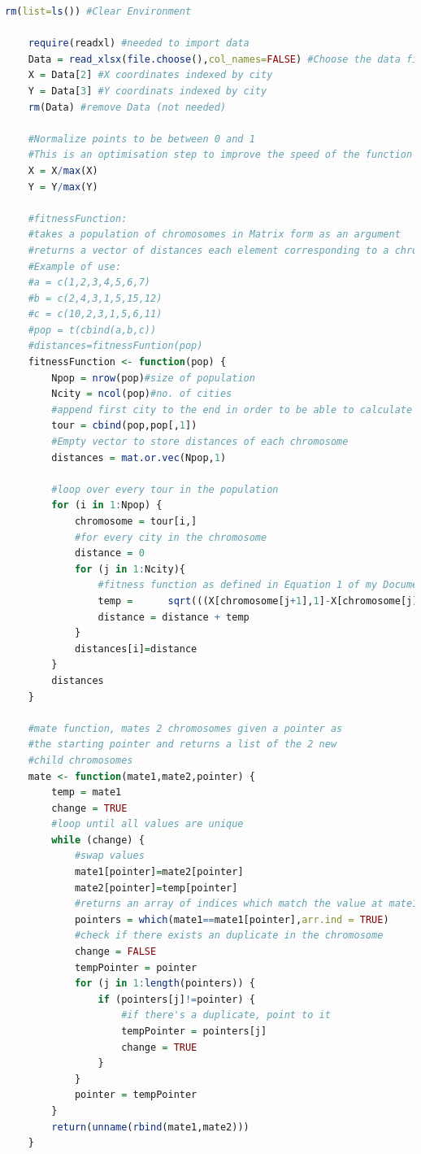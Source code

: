\documentclass[11pt,a4paper,final]{article}
\begin{document}
	\begin{lstlisting}[language = R,caption= Genetic Algorithm Code,label=GACode]
	rm(list=ls()) #Clear Environment
	
	require(readxl) #needed to import data
	Data = read_xlsx(file.choose(),col_names=FALSE) #Choose the data file you want to open
	X = Data[2] #X coordinates indexed by city
	Y = Data[3] #Y coordinats indexed by city
	rm(Data) #remove Data (not needed)
	
	#Normalize points to be between 0 and 1
	#This is an optimisation step to improve the speed of the function
	X = X/max(X)
	Y = Y/max(Y)
	
	#fitnessFunction:
	#takes a population of chromosomes in Matrix form as an argument
	#returns a vector of distances each element corresponding to a chromosome
	#Example of use:
	#a = c(1,2,3,4,5,6,7)
	#b = c(2,4,3,1,5,15,12)
	#c = c(10,2,3,1,5,6,11)
	#pop = t(cbind(a,b,c))
	#distances=fitnessFuntion(pop)
	fitnessFunction <- function(pop) {
		Npop = nrow(pop)#size of population
		Ncity = ncol(pop)#no. of cities
		#append first city to the end in order to be able to calculate the distance
		tour = cbind(pop,pop[,1]) 
		#Empty vector to store distances of each chromosome
		distances = mat.or.vec(Npop,1)
	
		#loop over every tour in the population
		for (i in 1:Npop) {
			chromosome = tour[i,]
			#for every city in the chromosome
			distance = 0
			for (j in 1:Ncity){
				#fitness function as defined in Equation 1 of my Documentation
				temp = 		sqrt(((X[chromosome[j+1],1]-X[chromosome[j],1])^2+(Y[chromosome[j+1],1]-Y[chromosome[j],1])^2))
				distance = distance + temp
			}
			distances[i]=distance
		}
		distances
	}
	
	#mate function, mates 2 chromosomes given a pointer as
	#the starting pointer and returns a list of the 2 new 
	#child chromosomes
	mate <- function(mate1,mate2,pointer) {
		temp = mate1
		change = TRUE
		#loop until all values are unique
		while (change) {
			#swap values
			mate1[pointer]=mate2[pointer]
			mate2[pointer]=temp[pointer]
			#returns an array of indices which match the value at mate1[pointer]:
			pointers = which(mate1==mate1[pointer],arr.ind = TRUE) 
			#check if there exists an duplicate in the chromosome
			change = FALSE
			tempPointer = pointer
			for (j in 1:length(pointers)) {
				if (pointers[j]!=pointer) {
					#if there's a duplicate, point to it
					tempPointer = pointers[j]
					change = TRUE
				}
			}
			pointer = tempPointer
		}
		return(unname(rbind(mate1,mate2)))
	}
	

\end{lstlisting}
\end{document}
